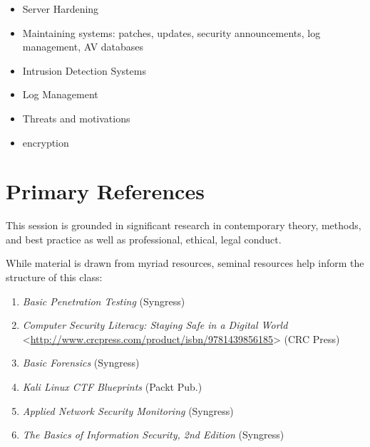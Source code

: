 \documentclass[letterpaper,10pt,english]{sphinxmanual}
\begin{document}
\begin{itemize}
\begin{description}
\begin{itemize}
\end{itemize}

\end{description}

\item {} 
Server Hardening

\item {} 
Maintaining systems: patches, updates, security announcements, log management, AV databases

\item {} 
Intrusion Detection Systems

\item {} 
Log Management

\item {} 
Threats and motivations

\item {} 
encryption

\end{itemize}


\section{Primary References}
\label{cybersecurity:primary-references}
This session is grounded in significant research in contemporary theory, methods, and best practice as well as professional, ethical, legal conduct.

While material is drawn from myriad resources, seminal resources help inform the structure of this class:
\begin{enumerate}
\item {} 
\emph{Basic Penetration Testing}  (Syngress)

\item {} 
\emph{Computer Security Literacy: Staying Safe in a Digital World} \textless{}\href{http://www.crcpress.com/product/isbn/9781439856185}{http://www.crcpress.com/product/isbn/9781439856185}\textgreater{} (CRC Press)

\item {} 
\emph{Basic Forensics} (Syngress)

\item {} 
\emph{Kali Linux CTF Blueprints} (Packt Pub.)

\item {} 
\emph{Applied Network Security Monitoring} (Syngress)

\item {} 
\emph{The Basics of Information Security, 2nd Edition} (Syngress)

\end{enumerate}
\end{document}
